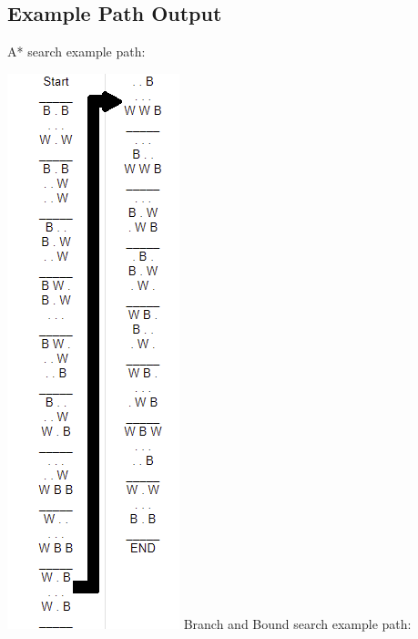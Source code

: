 \documentclass[12pt, letterpaper, final, onecolumn, titlepage] {article}
\begin{document}
\newpage

\subsection{Example Path Output}
\begin{multicols}{2}
\noindent A* search example path:

\includegraphics[scale=1]{AStarPath.png}
\vfill\null
\noindent Branch and Bound search example path:


\end{multicols}
\end{document}
